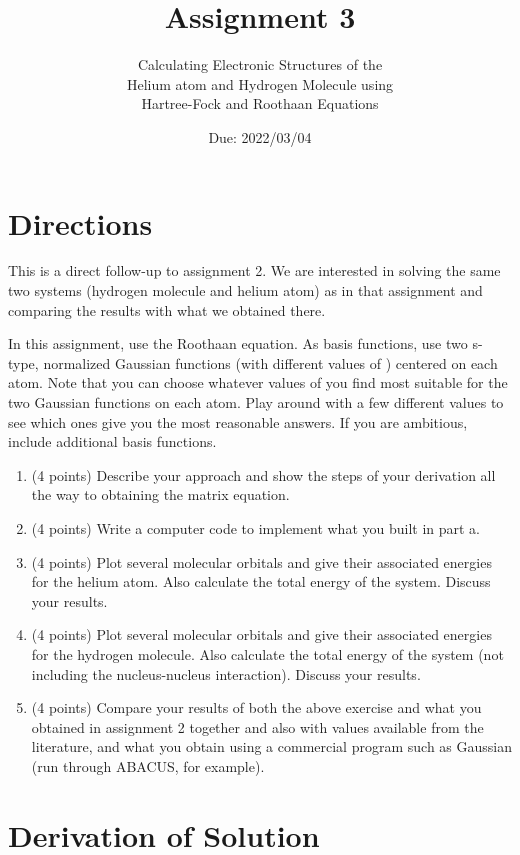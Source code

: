 \documentclass[10pt, oneside, letterpaper]{article}
\title{Assignment 3}
\author{Calculating Electronic Structures of the \\ Helium atom and Hydrogen Molecule using \\Hartree-Fock and Roothaan Equations}
\date{Due: 2022/03/04}
\begin{document}
\maketitle
\thispagestyle{fancy}

\section{Directions}

This is a direct follow-up to assignment 2. We are interested in solving the same two systems (hydrogen molecule and helium atom) as in that assignment and comparing the results with what we obtained there.

In this assignment, use the Roothaan equation. As basis functions, use two s-type, normalized Gaussian functions (with different values of \textalpha) centered on each atom. Note that you can choose whatever values of \textalpha you find most suitable for the two Gaussian functions on each atom. Play around with a few different \textalpha values to see which ones give you the most reasonable answers. If you are ambitious, include additional basis functions.

\begin{enumerate}[label=(\alph*)]
  \item (4 points) Describe your approach and show the steps of your derivation all the way to obtaining the matrix equation.
  \item (4 points) Write a computer code to implement what you built in part a.
  \item (4 points) Plot several molecular orbitals and give their associated energies for the helium atom. Also calculate the total energy of the system. Discuss your results.
  \item (4 points) Plot several molecular orbitals and give their associated energies for the hydrogen molecule. Also calculate the total energy of the system (not including the nucleus-nucleus interaction). Discuss your results.
  \item (4 points) Compare your results of both the above exercise and what you obtained in assignment 2 together and also with values available from the literature, and what you obtain using a commercial program such as Gaussian (run through ABACUS, for example).
\end{enumerate}

\section{Derivation of Solution}
\end{document}
